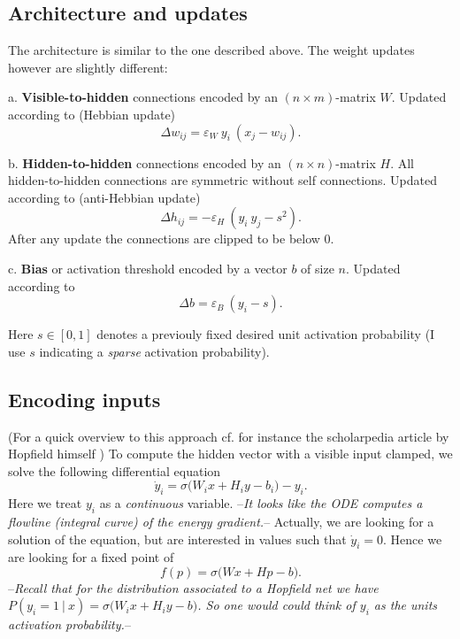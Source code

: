 \documentclass[titlepage]{amsart}
\newcommand{\thought}[1]{--\textit{#1}--}
\theoremstyle{definition}
\begin{document}
\subsection{Architecture and updates}
% 
% 
The architecture is similar to the one described above. The weight updates however 
are slightly different:
\begin{list}{}{}
\item[a.] \textbf{Visible-to-hidden} connections encoded by an $(n \times m)$-matrix $W$. 
          Updated according to (Hebbian update)
          $$
              \Delta w_{ij} = \varepsilon_W \ y_i \ (x_j - w_{ij}).
          $$
\item[b.] \textbf{Hidden-to-hidden} connections encoded by an $(n \times n)$-matrix $H$. 
          All hidden-to-hidden connections are symmetric without self connections. 
          Updated according to (anti-Hebbian update)
          $$
              \Delta h_{ij} = - \varepsilon_H\ ( y_i \ y_j - s^2).
          $$
          After any update the connections are clipped to be below $0$.
\item[c.] \textbf{Bias} or activation threshold encoded by a vector $b$ of size $n$. 
          Updated according to
          $$
              \Delta b = \varepsilon_B \ (y_i - s).
          $$
\end{list}
% 
Here $s \in [0,1]$ denotes a previouly fixed desired unit activation probability 
(I use $s$ indicating a \textit{sparse} activation probability).
% 
% 
\subsection{Encoding inputs}
% 
% 
(For a quick overview to this approach cf. for instance the scholarpedia article by 
Hopfield himself \cite{scholarpedia_hopfield}) To compute the hidden vector with a 
visible input clamped, we solve the following differential equation
$$
  \dot y_i = \sigma\big( W_i x + H_i y - b_i \big) - y_i.
$$
Here we treat $y_i$ as a \textit{continuous} variable.
\thought{It looks like the ODE computes a flowline (integral curve) of the energy gradient.} 
Actually, we are looking for a solution of the equation, but are interested in values
such that $\dot y_i = 0$.
Hence we are looking for a fixed point of
$$
f(p) = \sigma\big( Wx + Hp - b \big) .
$$
\thought{Recall that for the distribution associated to a Hopfield net we have
$P(y_i = 1 \ | \ x) = \sigma\big( W_i x + H_i y - b \big)$. So one would could
think of $y_i$ as the units activation probability.}
\end{document}
